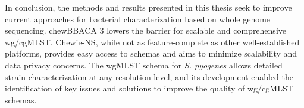 In conclusion, the methods and results presented in this thesis seek to improve current approaches for bacterial characterization based on whole genome sequencing. chewBBACA 3 lowers the barrier for scalable and comprehensive wg/cgMLST. Chewie-NS, while not as feature-complete as other well-established platforms, provides easy access to schemas and aims to minimize scalability and data privacy concerns. The wgMLST schema for \textit{S. pyogenes} allows detailed strain characterization at any resolution level, and its development enabled the identification of key issues and solutions to improve the quality of wg/cgMLST schemas.
